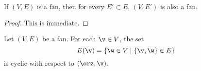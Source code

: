 
\begin{lemma}[]\label{lemma:subset-fan}
If $(V,E)$ is a fan, then for every $E'\subset E$, $(V,E')$ is also
a fan.
\end{lemma}

\begin{proof} This is immediate.
\end{proof}

\begin{lemma}[]  Let $(V,E)$ be a fan.
For each $\v\in V$, the set
\begin{displaymath}
E(\v) = \{\w\in V\mid \{\v,\w\}\in E\}
\end{displaymath}
is cyclic with respect to $(\orz,\v)$.
\end{lemma}
%

